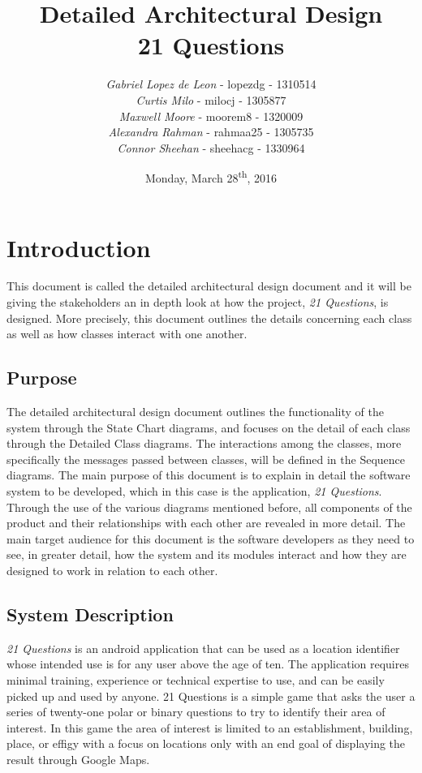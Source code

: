 \documentclass[titlepage]{article}
\title{\Huge{\textbf{Detailed Architectural Design\\21 Questions}}\vspace{9cm}}
\author{\textit{Gabriel Lopez de Leon} - lopezdg - 1310514\\\textit{Curtis Milo} - milocj - 1305877\\\textit{Maxwell Moore} - moorem8 - 1320009\\\textit{Alexandra Rahman} - rahmaa25 - 1305735\\\textit{Connor Sheehan} - sheehacg - 1330964}
\date{Monday, March 28\textsuperscript{th}, 2016}
\begin{document}
\maketitle	

\section{Introduction}
\label{sec:introduction}

This document is called the detailed architectural design document and it will be giving the stakeholders an in depth look at how the project, \textit{21 Questions}, is designed. More precisely, this document outlines the details concerning each class as well as how classes interact with one another.

\subsection{Purpose}
\label{sub:purpose}


The detailed architectural design document outlines the functionality of the system through the State Chart diagrams, and focuses on the detail of each class through the Detailed Class diagrams. The interactions among the classes, more specifically the messages passed between classes, will be defined in the Sequence diagrams.  The main purpose of this document is to explain in detail the software system to be developed, which in this case is the application, \textit{21 Questions}. Through the use of the various diagrams mentioned before, all components of the product and their relationships with each other are revealed in more detail. The main target audience for this document is the software developers as they need to see, in greater detail, how the system and its modules interact and how they are designed to work in relation to each other.


\subsection{System Description}
\label{sub:system_description}


\textit{21 Questions} is an android application that can be used as a location identifier whose intended use is for any user above the age of ten. The application requires minimal training, experience or technical expertise to use, and can be easily picked up and used by anyone. 21 Questions is a simple game that asks the user a series of twenty-one polar or binary questions to try to identify their area of interest. In this game the area of interest is limited to an establishment, building, place, or effigy with a focus on locations only with an end goal of displaying the result through Google Maps.
\end{document}
